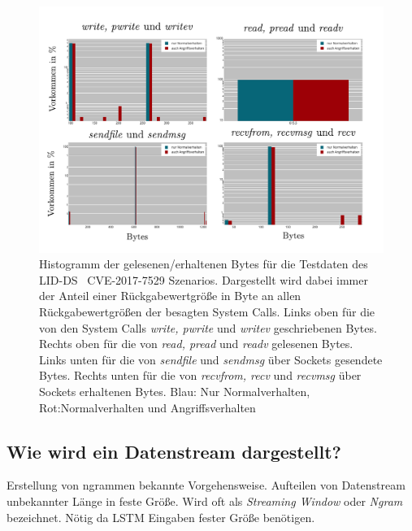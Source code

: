                 \begin{figure}[ht]
                    \centering
                    \includegraphics[width=\textwidth]{images/return_2017_plot.pdf}
                    \caption{Histogramm der gelesenen/erhaltenen Bytes für die Testdaten des LID-DS~\cite{LID-DS} CVE-2017-7529 Szenarios.
                    Dargestellt wird dabei immer der Anteil einer Rückgabewertgröße in Byte an allen Rückgabewertgrößen der besagten System Calls.
                    Links oben für die von den System Calls \textit{write, pwrite} und \textit{writev} geschriebenen Bytes.
                    Rechts oben für die von \textit{read, pread} und \textit{readv} gelesenen Bytes.
                    Links unten für die von \textit{sendfile} und \textit{sendmsg} über Sockets gesendete Bytes.
                    Rechts unten für die von \textit{recvfrom, recv} und \textit{recvmsg} über Sockets erhaltenen Bytes.
                    Blau: Nur Normalverhalten, Rot:Normalverhalten und Angriffsverhalten}
                    \label{fig:return_values}
                \end{figure}

%
        \subsection{Wie wird ein Datenstream dargestellt?}\label{sec:streamdarstellung}
            Erstellung von ngrammen bekannte Vorgehensweise.
            Aufteilen von Datenstream unbekannter Länge in feste Größe.
            Wird oft als \textit{Streaming Window} oder \textit{Ngram} bezeichnet.
            Nötig da \ac{LSTM} Eingaben fester Größe benötigen.

